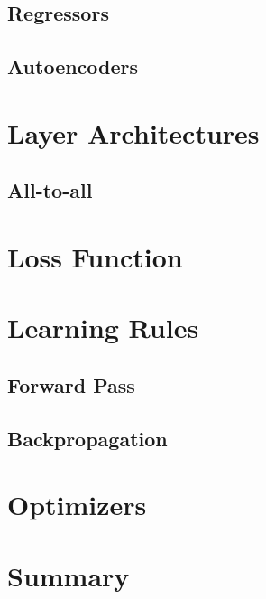 \documentclass{templates/ucdenverthesis}
\begin{document}
\hypertarget{sec:regressors}{%
\subsection{Regressors}\label{sec:regressors}}

\hypertarget{sec:autoencoders}{%
\subsection{Autoencoders}\label{sec:autoencoders}}

\hypertarget{sec:architectures}{%
\section{Layer Architectures}\label{sec:architectures}}

\hypertarget{sec:all2all}{%
\subsection{All-to-all}\label{sec:all2all}}

\hypertarget{sec:lossfunc}{%
\section{Loss Function}\label{sec:lossfunc}}

\hypertarget{sec:learningrules}{%
\section{Learning Rules}\label{sec:learningrules}}

\hypertarget{sec:fwdpass}{%
\subsection{Forward Pass}\label{sec:fwdpass}}

\hypertarget{sec:backprop}{%
\subsection{Backpropagation}\label{sec:backprop}}

\hypertarget{sec:optimizers}{%
\section{Optimizers}\label{sec:optimizers}}

\hypertarget{sec:ch2summary}{%
\section{Summary}\label{sec:ch2summary}}
\end{document}
